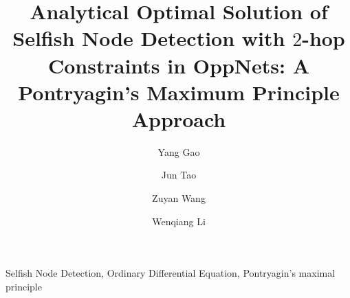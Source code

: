 \documentclass[conference]{IEEEtran}
\begin{document}
\title{Analytical Optimal Solution of Selfish Node Detection with $2$-hop Constraints in OppNets: A Pontryagin's Maximum Principle Approach
}
\author[1]{Yang Gao}
\author[1]{Jun Tao}
\author[1]{Zuyan Wang}
\author[1]{Wenqiang Li}



\maketitle



\begin{IEEEkeywords}
Selfish Node Detection, Ordinary Differential Equation,
Pontryagin's maximal principle
\end{IEEEkeywords}











\end{document}
